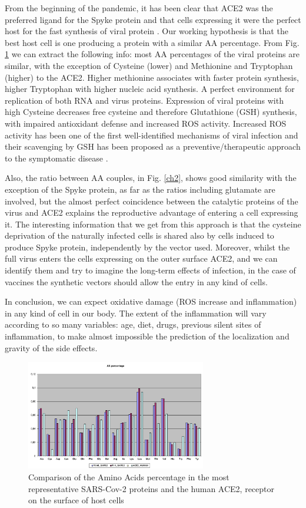 \documentclass[graybox]{svmult}
\begin{document}
From the beginning of the pandemic, it has been clear that ACE2 was the preferred ligand for the Spyke protein and that cells expressing it were the perfect host for the fast synthesis of viral protein \cite{scialo2020ace2}. Our working hypothesis is that the best host cell is one producing a protein with a similar AA percentage.
From Fig. \ref{ch1} we can extract the following info: most AA percentages of the viral proteins are similar, with the exception of Cysteine (lower) and Methionine and Tryptophan (higher) to the ACE2. Higher methionine associates with faster protein synthesis, higher Tryptophan with higher nucleic acid synthesis. A perfect environment for replication of both RNA and virus proteins. Expression of viral proteins with high Cysteine decreases free cysteine and therefore Glutathione (GSH) synthesis, with impaired antioxidant defense and increased ROS activity. Increased ROS activity has been one of the first well-identified mechanisms of viral infection \cite{Shenoy2020} and their scavenging by GSH has been proposed as a preventive/therapeutic approach to the symptomatic disease \cite{Silvagno_2020}.

Also, the ratio between AA couples, in Fig. \ref{ch2}, shows good similarity with the exception of the Spyke protein, as far as the ratios including glutamate are involved, but the almost perfect coincidence between the catalytic proteins of the virus and ACE2 explains the reproductive advantage of entering a cell expressing it.
The interesting information that we get from this approach is that the cysteine deprivation of the naturally infected cells is shared also by cells induced to produce Spyke protein, independently by the vector used.
Moreover, whilst the full virus enters the cells expressing on the outer surface ACE2, and we can identify them and try to imagine the long-term effects of infection, in the case of vaccines the synthetic vectors should allow the entry in any kind of cells.

In conclusion, we can expect oxidative damage (ROS increase and inflammation) in any kind of cell in our body. The extent of the inflammation will vary according to so many variables: age, diet, drugs, previous silent sites of inflammation, to make almost impossible the prediction of the localization and gravity of the side effects.

\begin{figure}[t]
\center
\includegraphics[width=0.7\textwidth]{R1AB_R1A_ACE2_ch1.png}
\caption{Comparison of the Amino Acids percentage in the most representative SARS-Cov-2 proteins and the human ACE2, receptor on the surface of host cells}
\label{ch1}
\end{figure}
\end{document}
